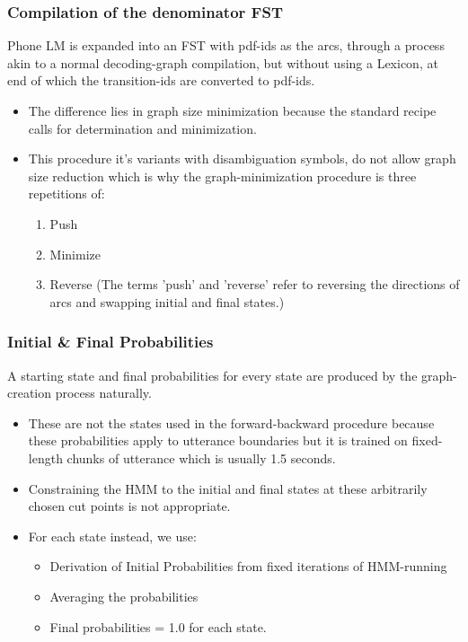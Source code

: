 \subsubsection{Compilation of the denominator FST} 
Phone LM is expanded into an FST with pdf-ids as the arcs, through a process akin to a normal decoding-graph compilation, but without using a Lexicon, at end of which the transition-ids are converted to pdf-ids. 
    \begin{itemize}
        \item The difference lies in graph size minimization because the standard recipe calls for determination and minimization. 
        \item This procedure it's variants with disambiguation symbols, do not allow graph size reduction which is why the graph-minimization procedure is three repetitions of: 
        \begin{enumerate}
            \item Push
            \item Minimize
            \item Reverse (The terms 'push' and 'reverse' refer to reversing the directions of arcs and swapping initial and final states.)
        \end{enumerate}
    \end{itemize}
    
\subsubsection{Initial \& Final Probabilities} 
A starting state and final probabilities for every state are produced by the graph-creation process naturally. 
    \begin{itemize}
        \item These are not the states used in the forward-backward procedure because these probabilities apply to utterance boundaries but it is trained on fixed-length chunks of utterance which is usually 1.5 seconds. 
        \item Constraining the HMM to the initial and final states at these arbitrarily chosen cut points is not appropriate. 
        \item For each state instead, we use: 
        \begin{itemize}
            \item Derivation of Initial Probabilities from fixed iterations of HMM-running 
            \item Averaging the probabilities
            \item Final probabilities = 1.0 for each state.
        \end{itemize}        
    \end{itemize}    

